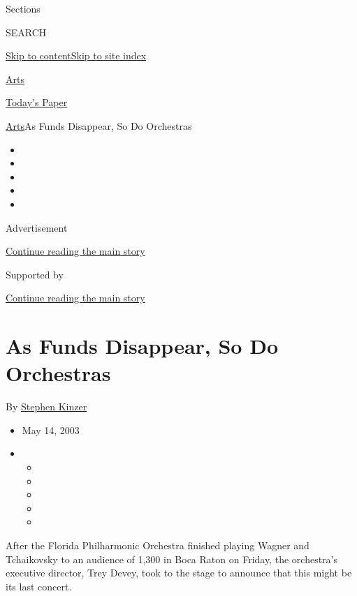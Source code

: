 Sections

SEARCH

\protect\hyperlink{site-content}{Skip to
content}\protect\hyperlink{site-index}{Skip to site index}

\href{https://www.nytimes.com/section/arts}{Arts}

\href{https://myaccount.nytimes.com/auth/login?response_type=cookie\&client_id=vi}{}

\href{https://www.nytimes.com/section/todayspaper}{Today's Paper}

\href{/section/arts}{Arts}\textbar{}As Funds Disappear, So Do Orchestras

\begin{itemize}
\item
\item
\item
\item
\item
\end{itemize}

Advertisement

\protect\hyperlink{after-top}{Continue reading the main story}

Supported by

\protect\hyperlink{after-sponsor}{Continue reading the main story}

\hypertarget{as-funds-disappear-so-do-orchestras}{%
\section{As Funds Disappear, So Do
Orchestras}\label{as-funds-disappear-so-do-orchestras}}

By \href{https://www.nytimes.com/by/stephen-kinzer}{Stephen Kinzer}

\begin{itemize}
\item
  May 14, 2003
\item
  \begin{itemize}
  \item
  \item
  \item
  \item
  \item
  \end{itemize}
\end{itemize}

After the Florida Philharmonic Orchestra finished playing Wagner and
Tchaikovsky to an audience of 1,300 in Boca Raton on Friday, the
orchestra's executive director, Trey Devey, took to the stage to
announce that this might be its last concert.

